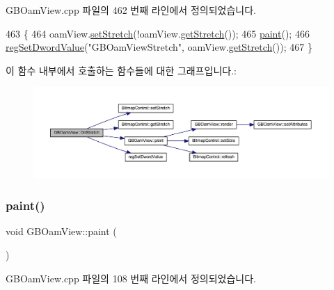G\+B\+Oam\+View.\+cpp 파일의 462 번째 라인에서 정의되었습니다.


\begin{DoxyCode}
463 \{
464   oamView.\mbox{\hyperlink{class_bitmap_control_ab545e15ea3edda9f0d80c0b8b0b7c812}{setStretch}}(!oamView.\mbox{\hyperlink{class_bitmap_control_a1d3cff9a3b57dd7558d678177dcf4b5c}{getStretch}}());
465   \mbox{\hyperlink{class_g_b_oam_view_a8ed062f5cac9239a17b0f5942a5d9e5b}{paint}}();
466   \mbox{\hyperlink{_reg_8cpp_a758e775489a3fb5c3cc7071fdd5af87e}{regSetDwordValue}}(\textcolor{stringliteral}{"GBOamViewStretch"}, oamView.\mbox{\hyperlink{class_bitmap_control_a1d3cff9a3b57dd7558d678177dcf4b5c}{getStretch}}());  
467 \}
\end{DoxyCode}
이 함수 내부에서 호출하는 함수들에 대한 그래프입니다.\+:
\nopagebreak
\begin{figure}[H]
\begin{center}
\leavevmode
\includegraphics[width=350pt]{class_g_b_oam_view_a580f292889a2fd21ab0bbf217d6abaa3_cgraph}
\end{center}
\end{figure}
\mbox{\label{class_g_b_oam_view_a8ed062f5cac9239a17b0f5942a5d9e5b}} 
\subsubsection{\texorpdfstring{paint()}{paint()}}
{\footnotesize\ttfamily void G\+B\+Oam\+View\+::paint (\begin{DoxyParamCaption}{ }\end{DoxyParamCaption})}



G\+B\+Oam\+View.\+cpp 파일의 108 번째 라인에서 정의되었습니다.


